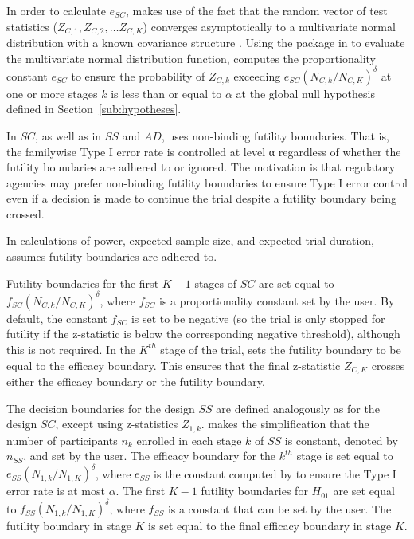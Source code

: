 \documentclass[article]{jss}
\begin{document}
In order to calculate $e_{SC}$,  makes use of the fact that the random vector of test statistics ($Z_{C,1},Z_{C,2},…Z_{C,K}$) converges asymptotically to a multivariate normal distribution with a known covariance structure \citep{JennisonTurnbullBook}. %
Using the  package \citep{mvtnorm} in  to evaluate the multivariate normal distribution function,  computes the proportionality constant $e_{SC}$ to ensure the probability of $Z_{C,k}$ exceeding $e_{SC}(N_{C,k}/N_{C,K})^{\delta}$ at one or more stages $k$ is less than or equal to $α$ at the global null hypothesis defined in Section~\ref{sub:hypotheses}.

In $SC$, as well as in $SS$ and $AD$,  uses non-binding futility boundaries. That is, the familywise Type I error rate is controlled at level α regardless of whether the futility boundaries are adhered to or ignored. The motivation  is that regulatory agencies may prefer non-binding futility boundaries to ensure Type I error control even if a decision is made to continue the trial despite a futility boundary being crossed.

In calculations of power, expected sample size, and expected trial duration,  assumes futility boundaries are adhered to. 

Futility boundaries for the first $K-1$ stages of $SC$ are set equal to $f_{SC}(N_{C,k}/N_{C,K})^{\delta}$, where $f_{SC}$ is a proportionality constant set by the user. By default, the constant $f_{SC}$ is set to be negative (so the trial  is only stopped for futility  if the z-statistic is below the corresponding negative threshold), although this is not required. In the $K ^{th}$ stage of the trial,  sets the futility boundary to be equal to the efficacy boundary. This ensures that the final z-statistic $Z_{C,K}$ crosses either the efficacy boundary or the futility boundary.

The decision boundaries for the design $SS$  are defined analogously as for the design $SC$, except using z-statistics $Z_{1,k}$.  makes the simplification that the number of participants $n_k$ enrolled in each stage $k$ of $SS$ is constant, denoted by $n_{SS}$, and set by the user.
The efficacy boundary for the $k^{th}$ stage is set equal to $e_{SS}(N_{1,k}/N_{1,K})^{\delta}$, where $e_{SS}$ is the constant computed by    to ensure  the  Type I error rate is at most $\alpha$. The first $K-1$ futility boundaries for $H_{01}$ are set equal to $f_{SS}(N_{1,k}/N_{1,K})^{\delta}$,  where $f_{SS}$ is a constant that can be set by the user. The futility boundary in stage $K$ is set equal to the final efficacy boundary in stage $K$.
\end{document}
